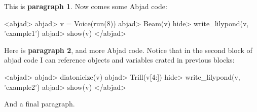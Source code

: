 \documentclass[11pt]{article}
\begin{document}
This is \textbf{paragraph 1}.
Now comes some Abjad code:

<abjad>
   abjad> v = Voice(run(8))
   abjad> Beam(v)
   hide> write_lilypond(v, 'example1')
   abjad> show(v)
</abjad>

Here is \textbf{paragraph 2}, and more Abjad code. Notice that in the second block of abjad code I can reference objects and variables crated in previous blocks:

<abjad>
   abjad> diatonicize(v)
   abjad> Trill(v[4:])
   hide> write_lilypond(v, 'example2')
   abjad> show(v)
</abjad>

And a final paragraph.
\end{document}
